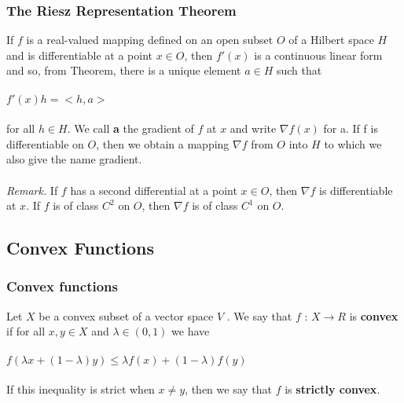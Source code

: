 \documentclass{beamer}
\begin{document}
\begin{frame}
\frametitle{The Riesz Representation Theorem}
If $f$ is a real-valued mapping defined on an open subset $O$ of a Hilbert space $H$
and is differentiable at a point $x \in O$, then $f'(x)$ is a continuous linear form and
so, from Theorem, there is a unique element $a \in H$ such that \\~\\

\hspace{3cm} $f'(x) h = <h,a>$ \\~\\
for all $h \in H$. We call \textbf{a} the gradient of $f$ at $x$ and write $\nabla f(x)$ for a. If f is differentiable on $O$, then we obtain a mapping $\nabla f$ from $O$ into $H$ to which we also
give the name gradient.\\~\\

\textit{Remark.} If $f$ has a second differential at a point $x \in O$, then $\nabla f$ is
differentiable at $x$. If $f$ is of class $C^2$ on $O$, then $\nabla f$ is of class $C^1$ on $O$.
\end{frame}


\subsection{Convex Functions}

\begin{frame}
\frametitle{Convex functions}
Let $X$ be a convex subset of a vector space $V$ . We say that $f$ : $X \to R$ is \textbf{convex} if for all $x, y \in X$ and $ \lambda \in (0,1)$ we have \\~\\

\hspace{2cm} $ f\left( \lambda x + (1- \lambda ) y\right) \leq \lambda f(x) + (1-\lambda) f(y)$\\~\\

If this inequality is strict when $x \neq y$, then we say that $f$ is \textbf{strictly convex}.



\end{frame}
\end{document}

